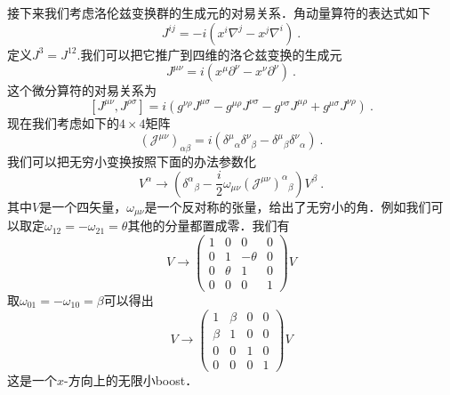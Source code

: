 接下来我们考虑洛伦兹变换群的生成元的对易关系．角动量算符的表达式如下
\begin{equation}
J^{ij} = -i (x^i\nabla^j- x^j\nabla^i)~.
\end{equation}
定义$J^3 = J^{12}$.我们可以把它推广到四维的洛仑兹变换的生成元
\begin{equation}
J^{\mu\nu} = i (x^\mu \partial^\nu - x^\nu \partial^\nu)~.
\end{equation}
这个微分算符的对易关系为
\begin{equation}\label{Dirac_eq4}
[J^{\mu\nu},J^{\rho\sigma}] = i (g^{\nu\rho}J^{\mu\sigma} - g^{\mu\rho}J^{\nu\sigma}-g^{\nu\sigma}J^{\mu\rho}+g^{\mu\sigma}J^{\nu\rho})~.
\end{equation}
现在我们考虑如下的$4\times 4$矩阵
\begin{equation}
(\mathcal J^{\mu\nu})_{\alpha\beta} = i (\delta^\mu{}_\alpha \delta^\nu{}_\beta - \delta^\mu{}_\beta \delta^\nu{}_\alpha)~.
\end{equation}
我们可以把无穷小变换按照下面的办法参数化
\begin{equation}
V^\alpha \rightarrow (\delta^\alpha{}_\beta - \frac{i}{2}\omega_{\mu\nu}(\mathcal J^{\mu\nu})^\alpha{}_\beta) V^\beta ~.
\end{equation}
其中$V$是一个四矢量，$\omega_{\mu\nu}$是一个反对称的张量，给出了无穷小的角．例如我们可以取定$\omega_{12}=-\omega_{21} = \theta$其他的分量都置成零．我们有
\begin{equation}
V \rightarrow \begin{pmatrix}
1 & 0 & 0 & 0 \\
0 & 1 & -\theta & 0 \\
0 & \theta & 1 & 0 \\
0 & 0 & 0 & 1
\end{pmatrix}
V
\end{equation}
取$\omega_{01} = -\omega_{10}=\beta$可以得出
\begin{equation}
V \rightarrow \begin{pmatrix}
1 & \beta & 0 & 0 \\
\beta & 1 & 0 & 0 \\
0 & 0 & 1 & 0 \\
0 & 0 & 0 & 1
\end{pmatrix}
V
\end{equation}
这是一个$x$-方向上的无限小boost．

